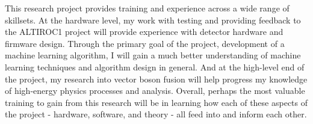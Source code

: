 \documentclass[paper=a4,fontsize=12pt]{article}
\begin{document}
This research project provides training and experience across a wide range of skillsets. At the hardware level, my work with testing and providing feedback to the ALTIROC1 project will provide experience with detector hardware and firmware design. Through the primary goal of the project, development of a machine learning algorithm, I will gain a much better understanding of machine learning techniques and algorithm design in general. And at the high-level end of the project, my research into vector boson fusion will help progress my knowledge of high-energy physics processes and analysis. Overall, perhaps the most valuable training to gain from this research will be in learning how each of these aspects of the project - hardware, software, and theory - all feed into and inform each other.
\end{document}
